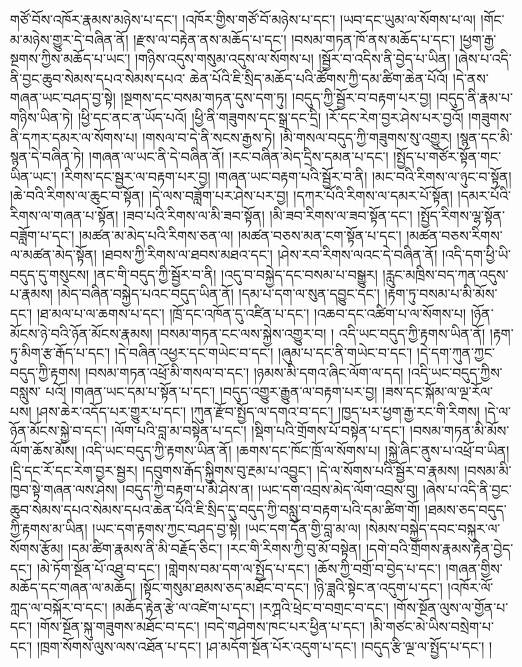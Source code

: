 གཙོ་བོས་འཁོར་རྣམས་མཉེས་པ་དང་། །འཁོར་གྱིས་གཙོ་བོ་མཉེས་པ་དང་། །ཡབ་དང་ཡུམ་ལ་སོགས་པ་ལ། །གོང་མ་མཉེས་གྱུར་དེ་བཞིན་ནོ། །རྫས་ལ་བརྟེན་ནས་མཆོད་པ་དང་། །བསམ་གཏན་ཁོ་ནས་མཆོད་པ་དང་། །ཕྱག་རྒྱ་སྔགས་ཀྱིས་མཆོད་པ་ཡང་། །གཉིས་འདུས་གསུམ་འདུས་ལ་སོགས་པ། །སྦྱོར་བ་འདིས་ནི་བྱེད་པ་ཡིན། །ཞེས་པ་འདི་ནི་བྱང་ཆུབ་སེམས་དཔའ་སེམས་དཔའ་​ ཆེན་པོའི་ཇི་སྲིད་མཆོད་པའི་ཚོགས་ཀྱི་དམ་ཚིག་ཆེན་པོའོ། །དེ་ནས་གཞན་ཡང་བཤད་བྱ་སྟེ། །སྔགས་དང་བསམ་གཏན་དུས་དག་ཏུ། །བདུད་ཀྱི་སྦྱོར་བ་བརྟག་པར་བྱ། །བདུད་ནི་རྣམ་པ་གཉིས་ཡིན་ཏེ། །ཕྱི་དང་ནང་ན་ཡོད་པའོ། །ཕྱི་ནི་གཟུགས་དང་སྒྲ་དང་དྲི། །རོ་དང་རེག་བྱར་ཤེས་པར་བྱའོ། །གཟུགས་ནི་དཀར་དམར་ལ་སོགས་པ། །གསལ་བ་དེ་ནི་སངས་རྒྱས་ཏེ། །མི་གསལ་བདུད་ཀྱི་གཟུགས་སུ་འགྱུར། །སྙན་དང་མི་སྙན་དེ་བཞིན་ཏེ། །གཞན་ལ་ཡང་ནི་དེ་བཞིན་ནོ། །རང་བཞིན་མེད་དྲིས་དམན་པ་དང་། །སྤྱོད་པ་གཙོར་སྟོན་གང་ཡིན་ཡང་། །རིགས་དང་སྦྱར་ལ་བརྟག་པར་བྱ། །གཞན་ཡང་བརྟག་པའི་སྦྱོར་བ་ནི། །མང་བའི་རིགས་ལ་ཉུང་བ་སྟོན། །ཆེ་བའི་རིགས་ལ་ཆུང་བ་སྟོན། །དེ་ལས་བཟློག་པར་ཤེས་པར་བྱ། །དཀར་པོའི་རིགས་ལ་དམར་པོ་སྟོན། །དམར་པོའི་རིགས་ལ་གཞན་པ་སྟོན། །ཟབ་པའི་རིགས་ལ་མི་ཟབ་སྟོན། །མི་ཟབ་རིགས་ལ་ཟབ་སྟོན་དང་། །སྤྱོད་རིགས་ལྷ་སྟོན་བཟློག་པ་དང་། །མཚན་མ་མེད་པའི་རིགས་ཅན་ལ། །མཚན་བཅས་མན་ངག་སྟོན་པ་དང་། །མཚན་བཅས་རིགས་ལ་མཚན་མེད་སྟོན། །ཐབས་ཀྱི་རིགས་ལ་ཐབས་མཐའ་དང་། །ཤེས་རབ་རིགས་ལའང་དེ་བཞིན་ནོ། །འདི་དག་ཕྱི་ཡི་བདུད་དུ་གསུངས། །ནང་གི་བདུད་ཀྱི་སྦྱོར་བ་ནི། །འདུ་བ་བསྐྱེད་དང་བསམ་པ་བསྒྱུར། །རླུང་མཁྲིས་བད་ཀན་འདུས་པ་རྣམས། །མེད་བཞིན་བསྐྱེད་པའང་བདུད་ཡིན་ནོ། །དམ་པ་དག་ལ་སུན་དབྱུང་དང་། །རྟག་ཏུ་བསམ་པ་མི་མོས་དང་། །ཐ་མལ་པ་ལ་ཆགས་པ་དང་། །ཁྲོ་དང་འཁོན་དུ་འཛིན་པ་དང་། །འཆབ་དང་འཚིག་པ་ལ་སོགས་པ། །ཉོན་མོངས་ཉེ་བའི་ཉོན་མོངས་རྣམས། །བསམ་གཏན་ངང་ལས་སྐྱེས་འགྱུར་བ། །
འདི་ཡང་བདུད་ཀྱི་རྟགས་ཡིན་ནོ། །རྟག་ཏུ་མིག་རྩ་རྒོད་པ་དང་། །དེ་བཞིན་འཕྱར་དང་གཡེང་བ་དང་། །ཞུམ་པ་དང་ནི་གཡེང་བ་དང་། །དེ་དག་ཀུན་ཀྱང་བདུད་ཀྱི་རྟགས། །བསམ་གཏན་འཕྲོ་མི་གསལ་བ་དང་། །ཉམས་མི་དགའ་ཞིང་ལོག་ལ་དད། །འདི་ཡང་བདུད་ཀྱིས་བསླུས་​ པའོ། །གཞན་ཡང་དམ་པ་སྟོན་པ་དང་། །བདུད་འགྱུར་རྒྱུན་ལ་བརྟག་པར་བྱ། །ཟས་དང་སྐོམ་ལ་ལྔ་རོལ་པས། །ཤས་ཆེར་འདོད་པར་གྱུར་པ་དང་། །ཀུན་རྫོབ་སྤྱོད་ལ་དགའ་བ་དང་། །ཁྱད་པར་ཕྱག་རྒྱ་རང་གི་རིགས། །དེ་ལ་ཉོན་མོངས་སྐྱེ་བ་དང་། །ལོག་པའི་བླ་མ་བསྟེན་པ་དང་། །སྡིག་པའི་གྲོགས་པོ་བསྟེན་པ་དང་། །བསམ་གཏན་མི་མོས་ལོག་ཆོས་མོས། །འདི་ཡང་བདུད་ཀྱི་རྟགས་ཡིན་ནོ། །ཆགས་དང་ཁོང་ཁྲོ་ལ་སོགས་པ། །སྐྱེ་ཞིང་ནུས་པ་འཕྲོ་བ་ཡིན། །དྲི་དང་རོ་དང་རེག་བྱར་སྦྱར། །དབུགས་རྒོད་སྐྱིགས་བུ་རྔམ་པ་འབྱུང་། །དེ་ལ་སོགས་པའི་སྦྱོར་བ་རྣམས། །བསམ་མི་ཁྱབ་སྟེ་གཞན་ལས་ཤེས། །བདུད་ཀྱི་བརྟག་པ་མི་ཤེས་ན། །ཡང་དག་འབྲས་མེད་ལོག་འབྲས་བུ། །ཞེས་པ་འདི་ནི་བྱང་ཆུབ་སེམས་དཔའ་སེམས་དཔའ་ཆེན་པོའི་ཇི་སྲིད་དུ་བདུད་ཀྱི་བསླུ་བ་བརྟག་པའི་དམ་ཚིག་གོ། །ཐམས་ཅད་བདུད་ཀྱི་རྟགས་མ་ཡིན། །ཡང་དག་རྟགས་ཀྱང་བཤད་བྱ་སྟེ། །ཡང་དག་དོན་གྱི་བླ་མ་ལ། །སེམས་བསྐྱེད་དབང་བསྐུར་ལ་སོགས་རྩོམ། །དམ་ཚིག་རྣམས་ནི་མི་བརྗོད་ཅིང་། །རང་གི་རིགས་ཀྱི་བུ་མོ་བསྟེན། །དགེ་བའི་གྲོགས་རྣམས་རྟེན་བྱེད་དང་། །མེ་ཏོག་སྔོན་པོ་འཐུ་བ་དང་། །གླེགས་བམ་དག་ལ་སྤྱོད་པ་དང་། །ཆོས་ཀྱི་བགྲོ་བ་བྱེད་པ་དང་། །གཞན་གྱིས་མཆོད་དང་གཞན་ལ་མཆོད། །སྟོང་གསུམ་ཐམས་ཅད་མཐོང་བ་དང་། །ཉི་ཟླའི་སྟེང་ན་འདུག་པ་དང་། །འཁོར་ལོ་ཀླད་ལ་བསྐོར་བ་དང་། །མཆོད་རྟེན་རྩེ་ལ་འཛེག་པ་དང་། །རཀྴའི་ཕྲེང་བ་བགྲང་བ་དང་། །གོས་སྔོན་ལུས་ལ་གྱོན་པ་དང་། །གོས་སྔོན་སྐུ་གཟུགས་མཐོང་བ་དང་། །བདེ་གཤེགས་ཁང་པར་ཕྱིན་པ་དང་། །མི་གཙང་མེ་ཡིས་བསྲེག་པ་དང་། །ཁྲག་སོགས་ལུས་ལས་འཐོན་པ་དང་། །ཤ་མདོག་སྔོན་པོར་འདུག་པ་དང་། །བདུད་རྩི་ལྔ་ལ་སྤྱོད་པ་དང་། །
